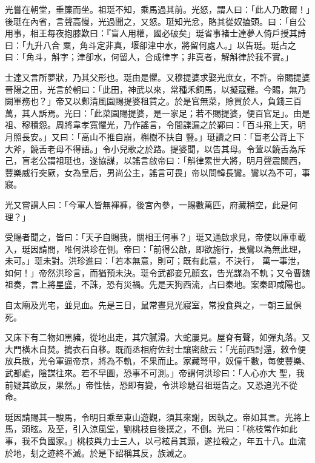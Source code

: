 \begin{pinyinscope}
 光嘗在朝堂，垂簾而坐。祖珽不知，乘馬過其前。光怒，謂人曰：「此人乃敢爾！」後珽在內省，言聲高慢，光過聞之，又怒。珽知光忿，賂其從奴搕頭。曰：「自公用事，相王每夜抱膝歎曰：『盲人用權，國必破矣」珽省事褚士達夢人倚戶授其詩曰：「九升八合
 粟，角斗定非真，堰卻津中水，將留何處人。」以告珽。珽占之曰：「角斗，斛字；津卻水，何留人，合成律字；非真者，解斛律於我不實。」



 士達又言所夢狀，乃其父形也。珽由是懼。又穆提婆求娶光庶女，不許。帝賜提婆晉陽之田，光言於朝曰：「此田，神武以來，常種禾飼馬，以擬寇難。今賜，無乃闕軍務也？」帝又以鄴清風園賜提婆租賃之。於是官無菜，賒買於人，負錢三百萬，其人訴焉。光曰：「此菜園賜提婆，是一家足；若不賜提婆，便百官足」。由是祖、穆積怨。周將韋孝寬懼光，乃作謠言，令間諜漏之於鄴曰：「百斗飛上天，明月照長安。」又曰：「高山不推自崩，槲樹不扶自
 豎。」珽讀之曰：「盲老公背上下大斧，饒舌老母不得語。」令小兒歌之於路。提婆聞，以告其母。令萱以饒舌為斥己，盲老公謂祖珽也，遂協謀，以謠言啟帝曰：「斛律累世大將，明月聲震關西，豐樂威行突厥，女為皇后，男尚公主，謠言可畏」帝以問韓長鸞。鸞以為不可，事寢。



 光又嘗謂人曰：「今軍人皆無褌褲，後宮內參，一賜數萬匹，府藏稍空，此是何理？」



 受賜者聞之，皆曰：「天子自賜我，關相王何事？」珽又通啟求見，帝使以庫車載入，珽因請間，唯何洪珍在側。帝曰：「前得公啟，即欲施行，長鸞以為無此理，未可。」珽未對。洪珍進曰：「若本無意，則可；既有此意，不決行，
 萬一事泄，如何！」帝然洪珍言，而猶預未決。珽令武都妾兄顏玄，告光謀為不軌；又令曹魏祖奏，言上將星盛，不誅，恐有災禍。先是天狗西流，占曰秦地。案秦即咸陽也。



 自太廟及光宅，並見血。先是三日，鼠常晝見光寢室，常投食與之，一朝三鼠俱死。



 又床下有二物如黑豬，從地出走，其穴膩滑。大蛇屢見。屋脊有聲，如彈丸落。又大門橫木自焚。搗衣石自移。既而丞相府佐封士讓密啟云：「光前西討還，敕令便放兵散，光令軍逼帝京，將為不軌，不果而止。家藏弩甲，奴僮千數，每使豐樂、武都處，陰謀往來。若不早圖，恐事不可測。」帝謂何洪珍曰：「人心亦大
 聖，我前疑其欲反，果然。」帝性怯，恐即有變，令洪珍馳召祖珽告之。又恐追光不從命。



 珽因請賜其一駿馬，令明日乘至東山遊觀，須其來謝，因執之。帝如其言。光將上馬，頭眩。及至，引入涼風堂，劉桃枝自後撲之，不倒。光曰：「桃枝常作如此事，我不負國家。」桃枝與力士三人，以弓絃肙其頸，遂拉殺之，年五十八。血流於地，刬之迹終不滅。於是下詔稱其反，族滅之。




\end{pinyinscope}
